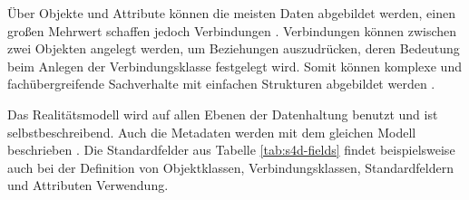 Über Objekte und Attribute können die meisten Daten abgebildet werden, einen großen Mehrwert schaffen jedoch Verbindungen \parencite{rudolfUmweltdatenIntelligenz2021}. Verbindungen können zwischen zwei Objekten angelegt werden, um Beziehungen auszudrücken, deren Bedeutung beim Anlegen der Verbindungsklasse festgelegt wird. Somit können komplexe und fachübergreifende Sachverhalte mit einfachen Strukturen abgebildet werden \parencite{grossmannFachsystemeSchemaevolution2024}.

Das Realitätsmodell wird auf allen Ebenen der Datenhaltung benutzt und ist selbstbeschreibend. Auch die Metadaten werden mit dem gleichen Modell beschrieben \parencite{grossmannFachsystemeSchemaevolution2024}. Die Standardfelder aus Tabelle \ref{tab:s4d-fields} findet beispielsweise auch bei der Definition von Objektklassen, Verbindungsklassen, Standardfeldern und Attributen Verwendung.

